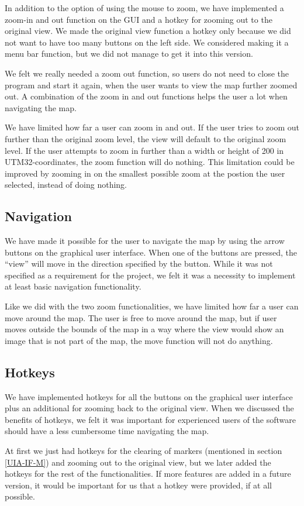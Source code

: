 In addition to the option of using the mouse to zoom, we have implemented a
zoom-in and out function on the GUI and a hotkey for zooming out to the original
view. We made the original view function a hotkey only because we did not want
to have too many buttons on the left side. We considered making it a menu bar
function, but we did not manage to get it into this version.

We felt we really needed a zoom out function, so users do not need to close the
program and start it again, when the user wants to view the map further zoomed
out. A combination of the zoom in and out functions helps the user a lot when
navigating the map.

We have limited how far a user can zoom in and out. If the user tries to zoom
out further than the original zoom level, the view will default to the original
zoom level. If the user attempts to zoom in further than a width or height of
200 in UTM32-coordinates, the zoom function will do nothing. This limitation
could be improved by zooming in on the smallest possible zoom at the postion the
user selected, instead of doing nothing.
\subsection{Navigation}
\label{UIA-IF-N}
We have made it possible for the user to navigate the map by using the arrow
buttons on the graphical user interface. When one of the buttons are pressed,
the ``view'' will move in the direction specified by the button. While it was
not specified as a requirement for the project, we felt it was a necessity to
implement at least basic navigation functionality.

Like we did with the two zoom functionalities, we have limited how far a user
can move around the map. The user is free to move around the map, but if user
moves outside the bounds of the map in a way where the view would show an image
that is not part of the map, the move function will not do anything.
\subsection{Hotkeys}
\label{UIA-IF-H}
We have implemented hotkeys for all the buttons on the graphical user interface
plus an additional for zooming back to the original view. When we discussed the
benefits of hotkeys, we felt it was important for experienced users of the
software should have a less cumbersome time navigating the map. 

At first we just had hotkeys for the clearing of markers (mentioned in section
\ref{UIA-IF-M}) and zooming out to the original view, but we later added the
hotkeys for the rest of the functionalities. If more features are added in a
future version, it would be important for us that a hotkey were provided, if at
all possible.

